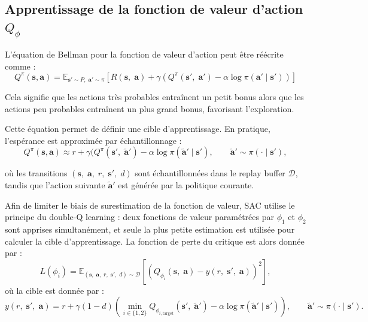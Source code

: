 

\subsection{Apprentissage de la fonction de valeur d'action $Q_\phi$}

\noindent L'équation de Bellman pour la fonction de valeur d'action peut être réécrite comme :
$$
    Q^\pi(\mathbf{s}, \mathbf{a})
    = \mathbb{E}_{\mathbf{s}'\sim P, \; \mathbf{a}' \sim \pi}
    [
        R(\mathbf{s}, \; \mathbf{a}) + \gamma (Q^\pi(\mathbf{s}', \;  \mathbf{a}') - \alpha \log \pi( \mathbf{a}' \mid \mathbf{s}'))
    ]
$$

\noindent Cela signifie que les actions très probables entraînent un petit bonus alors que les actions peu probables entraînent un plus grand bonus, favorisant l'exploration.

\vspace{10pt}

\noindent Cette équation permet de définir une cible d'apprentissage. En pratique, l'espérance est approximée par échantillonnage :
$$
    Q^\pi(\mathbf{s}, \mathbf{a})
    \approx r + \gamma (Q^\pi(\mathbf{s}', \; \tilde{\mathbf{a}}') - \alpha \log \pi(\tilde{\mathbf{a}}' \mid \mathbf{s}'),
    \qquad
    \tilde{\mathbf{a}}' \sim \pi(\cdot \mid \mathbf{s}'),
$$

\noindent où les transitions $(\textbf{s}, \; \textbf{a}, \; r, \; \textbf{s}', \; d)$ sont échantillonnées dans le replay buffer $\mathcal{D}$, tandis que l'action suivante $\tilde{\mathbf{a}}'$ est générée par la politique courante.

\vspace{10pt}

\noindent Afin de limiter le biais de surestimation de la fonction de valeur, SAC utilise le principe du double-Q learning \citep{haarnoja2018sac, vanHasselt2010} : deux fonctions de valeur paramétrées par $\phi_1$ et $\phi_2$ sont apprises simultanément, et seule la plus petite estimation est utilisée pour calculer la cible d'apprentissage. La fonction de perte du critique est alors donnée par :
$$
    L(\phi_i) = \mathbb{E}_{(\mathbf{s}, \; \mathbf{a}, \; r, \; \mathbf{s}', \;  d) \sim \mathcal{D}} \left[\left( Q_{\phi_i}(\mathbf{s},\;  \mathbf{a}) - y(r, \;  \mathbf{s}', \;  \mathbf{a})\right)^2\right],
$$
\noindent où la cible est donnée par :
$$
    y(r, \; \mathbf{s}', \; \mathbf{a}) = r + \gamma(1 - d) \left( \min_{i \in\{1,2\}} Q_{\phi_{i, \text{target}}} (\mathbf{s}', \; \tilde{\mathbf{a}}') - \alpha \log \pi(\tilde{\mathbf{a}}' \mid \mathbf{s}')\right),
    \qquad
    \tilde{\mathbf{a}}' \sim \pi(\cdot \mid \mathbf{s}').
$$

